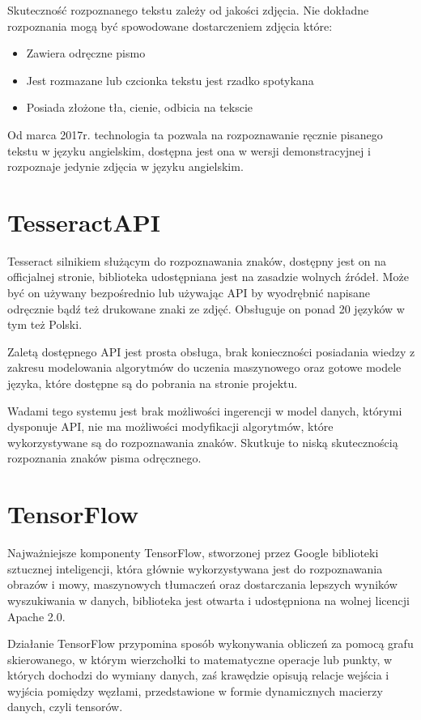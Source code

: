 \documentclass[brudnopis]{xmgr}
\begin{document}
Skuteczność rozpoznanego tekstu zależy od jakości zdjęcia. Nie dokładne rozpoznania mogą być spowodowane dostarczeniem zdjęcia które:

\begin{itemize}
\item
Zawiera odręczne pismo
\item
Jest rozmazane lub czcionka tekstu jest rzadko spotykana
\item
Posiada złożone tła, cienie, odbicia na tekscie
\end{itemize}

Od marca 2017r. technologia ta pozwala na rozpoznawanie ręcznie pisanego tekstu w języku angielskim, dostępna jest ona w wersji demonstracyjnej i rozpoznaje jedynie zdjęcia w języku angielskim.

\section{TesseractAPI}

Tesseract silnikiem służącym do rozpoznawania znaków, dostępny jest on na officjalnej stronie\cite{10}, biblioteka udostępniana jest na zasadzie wolnych źródeł. Może być on używany bezpośrednio lub używając API by wyodrębnić napisane odręcznie bądź też drukowane znaki ze zdjęć. Obsługuje on ponad 20 języków w tym też Polski.

Zaletą dostępnego API jest prosta obsługa, brak konieczności posiadania wiedzy z zakresu modelowania algorytmów do uczenia maszynowego oraz gotowe modele języka, które dostępne są do pobrania na stronie projektu.

Wadami tego systemu jest brak możliwości ingerencji w model danych, którymi dysponuje API, nie ma możliwości modyfikacji algorytmów, które wykorzystywane są do rozpoznawania znaków. Skutkuje to niską skutecznością rozpoznania znaków pisma odręcznego.

\section{TensorFlow}

Najważniejsze komponenty TensorFlow\cite{16}, stworzonej przez Google biblioteki sztucznej inteligencji, która głównie wykorzystywana jest do rozpoznawania obrazów i mowy, maszynowych tłumaczeń oraz dostarczania lepszych wyników wyszukiwania w danych, biblioteka jest otwarta i udostępniona na wolnej licencji Apache 2.0.

Działanie TensorFlow przypomina sposób wykonywania obliczeń za pomocą grafu skierowanego, w którym wierzchołki to matematyczne operacje lub punkty, w których dochodzi do wymiany danych, zaś krawędzie opisują relacje wejścia i wyjścia pomiędzy węzłami, przedstawione w formie dynamicznych macierzy danych, czyli tensorów.
\end{document}
